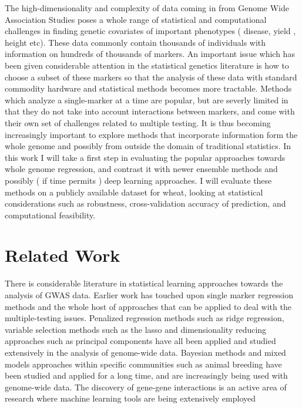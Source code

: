 \documentclass{sig-alternate-05-2015}
\begin{document}
The high-dimensionality and complexity of data coming in from Genome Wide Association Studies
poses a whole range of statistical and computational challenges in finding genetic covariates of important phenotypes
( disease, yield , height etc). These data commonly contain thousands of individuals with information on
hundreds of thousands of markers. \cite{zhang_chapter_2012} An important issue which has been given considerable attention in the statistical genetics
literature is how to choose a subset of these markers so that the analysis of these data with standard commodity hardware and statistical methods
becomes more tractable.\cite{de_los_campos_whole-genome_2013} Methods which analyze a single-marker at a time are popular, but are severly limited in that they do not take into account
interactions between markers, and come with their own set of challenges related to multiple testing.\cite{moskvina_multiple-testing_2008}
It is thus becoming increasingly important to explore methods that incorporate information form the whole genome and possibly from outside the domain of traditional statistics.
In this work I will take a first step in evaluating the popular approaches towards whole genome regression, and contrast it with newer ensemble methods
and possibly ( if time permits ) deep learning approaches. I will evaluate these methods on a publicly available dataset for wheat, looking
at statistical considerations such as robustness, cross-validation accuracy of prediction, and computational feasibility.

\section{Related Work}

There is considerable literature in statistical learning approaches towards the analysis of GWAS data. Earlier work has
touched upon single marker regression methods and the whole host of approaches that can be applied to
deal with the multiple-testing issues. Penalized regression methods such as ridge regression,\cite{austin_penalized_2013}
variable selection methods such as the lasso  and dimensionality reducing approaches such as principal components \cite{price_principal_2006} have all been applied and studied extensively in the analysis of
genome-wide data. Bayesian methods and mixed models approaches within specific communities such as animal breeding have been
studied and applied for a long time, and are increasingly being used with genome-wide data. \cite{de_los_campos_whole-genome_2013}
The discovery of gene-gene interactions is an active area of research where machine learning tools are being extensively employed \cite{upstill-goddard_machine_2013}
\end{document}
